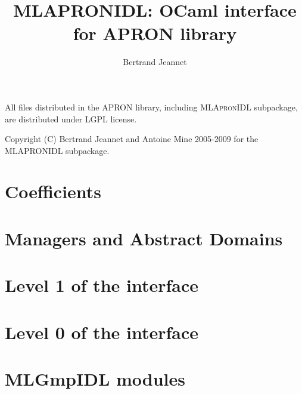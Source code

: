 \documentclass[twoside,10pt,a4paper]{report}
\title{MLAPRONIDL: OCaml interface for APRON library}
\author{Bertrand Jeannet}
\begin{document}
\maketitle

\vspace*{0.9\textheight}

All files distributed in the APRON library, including \textsc{MLApronIDL}
subpackage, are distributed under LGPL license.

Copyright (C) Bertrand Jeannet and Antoine Mine 2005-2009 for the
\textsc{MLAPRONIDL} subpackage.

\newpage

\tableofcontents



\part{Coefficients}




\part{Managers and Abstract Domains}







\part{Level 1 of the interface}










\part{Level 0 of the interface}








\part{MLGmpIDL modules}









\appendix
\printindex
\end{document}
